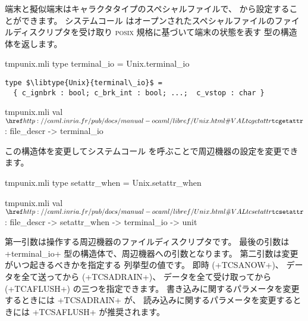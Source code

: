 端末と擬似端末はキャラクタタイプのスペシャルファイルで、 \ocaml から設定することができます。
システムコール  はオープンされたスペシャルファイルのファイルディスクリプタを受け取り
\textsc{posix} 規格に基づいて端末の状態を表す  型の構造体を返します。
%
\begin{codefile}{tmpunix.mli}
type terminal_io = Unix.terminal_io
\end{codefile}
%
\begin{lstlisting}
type $\libtype{Unix}{terminal\_io}$ =
  { c_ignbrk : bool; c_brk_int : bool; ...;  c_vstop : char }
\end{lstlisting}
%
\begin{listingcodefile}{tmpunix.mli}
val $\libvalue{Unix}{tcgetattr}$ : file_descr -> terminal_io
\end{listingcodefile}
%
この構造体を変更してシステムコール  を呼ぶことで周辺機器の設定を変更できます。
%
\begin{codefile}{tmpunix.mli}
type setattr_when = Unix.setattr_when
\end{codefile}
%
\begin{listingcodefile}{tmpunix.mli}
val $\libvalue{Unix}{tcsetattr}$ : file_descr -> setattr_when -> terminal_io -> unit
\end{listingcodefile}
%

第一引数は操作する周辺機器のファイルディスクリプタです。
最後の引数は \ml+terminal_io+ 型の構造体で、周辺機器への引数となります。
第二引数は変更がいつ起きるべきかを指定する  列挙型の値です。
即時 (\ml+TCSANOW+)、 データを全て送ってから (\ml+TCSADRAIN+)、 データを全て受け取ってから (\ml+TCAFLUSH+) の三つを指定できます。
書き込みに関するパラメータを変更するときには \ml+TCSADRAIN+ が、
読み込みに関するパラメータを変更するときには \ml+TCSAFLUSH+ が推奨されます。

